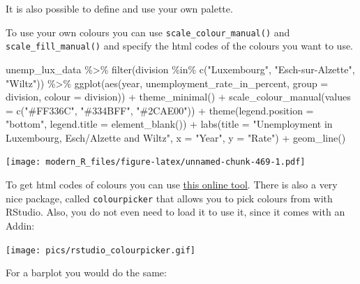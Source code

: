 \documentclass[
]{article}
\newenvironment{Shaded}{\begin{snugshade}}{\end{snugshade}}
\newcommand{\AttributeTok}[1]{\textcolor[rgb]{0.77,0.63,0.00}{#1}}
\newcommand{\FunctionTok}[1]{\textcolor[rgb]{0.00,0.00,0.00}{#1}}
\newcommand{\NormalTok}[1]{#1}
\newcommand{\SpecialCharTok}[1]{\textcolor[rgb]{0.00,0.00,0.00}{#1}}
\newcommand{\StringTok}[1]{\textcolor[rgb]{0.31,0.60,0.02}{#1}}
\begin{document}
It is also possible to define and use your own palette.

To use your own colours you can use \texttt{scale\_colour\_manual()} and \texttt{scale\_fill\_manual()} and specify
the html codes of the colours you want to use.

\begin{Shaded}
\begin{Highlighting}[]
\NormalTok{unemp\_lux\_data }\SpecialCharTok{\%\textgreater{}\%}
  \FunctionTok{filter}\NormalTok{(division }\SpecialCharTok{\%in\%} \FunctionTok{c}\NormalTok{(}\StringTok{"Luxembourg"}\NormalTok{, }\StringTok{"Esch{-}sur{-}Alzette"}\NormalTok{, }\StringTok{"Wiltz"}\NormalTok{)) }\SpecialCharTok{\%\textgreater{}\%}
  \FunctionTok{ggplot}\NormalTok{(}\FunctionTok{aes}\NormalTok{(year, unemployment\_rate\_in\_percent, }\AttributeTok{group =}\NormalTok{ division, }\AttributeTok{colour =}\NormalTok{ division)) }\SpecialCharTok{+}
  \FunctionTok{theme\_minimal}\NormalTok{() }\SpecialCharTok{+}
  \FunctionTok{scale\_colour\_manual}\NormalTok{(}\AttributeTok{values =} \FunctionTok{c}\NormalTok{(}\StringTok{"\#FF336C"}\NormalTok{, }\StringTok{"\#334BFF"}\NormalTok{, }\StringTok{"\#2CAE00"}\NormalTok{)) }\SpecialCharTok{+}
  \FunctionTok{theme}\NormalTok{(}\AttributeTok{legend.position =} \StringTok{"bottom"}\NormalTok{, }\AttributeTok{legend.title =} \FunctionTok{element\_blank}\NormalTok{()) }\SpecialCharTok{+}
  \FunctionTok{labs}\NormalTok{(}\AttributeTok{title =} \StringTok{"Unemployment in Luxembourg, Esch/Alzette and Wiltz"}\NormalTok{, }\AttributeTok{x =} \StringTok{"Year"}\NormalTok{, }\AttributeTok{y =} \StringTok{"Rate"}\NormalTok{) }\SpecialCharTok{+}
  \FunctionTok{geom\_line}\NormalTok{()}
\end{Highlighting}
\end{Shaded}

\texttt{[image: modern\_R\_files/figure-latex/unnamed-chunk-469-1.pdf]}

To get html codes of colours you can use \href{http://htmlcolorcodes.com/color-picker/}{this online
tool}.
There is also a very nice package, called \texttt{colourpicker} that allows you to
pick colours from with RStudio. Also, you do not even need to load it to use
it, since it comes with an Addin:

\texttt{[image: pics/rstudio\_colourpicker.gif]}

For a barplot you would do the same:
\end{document}
